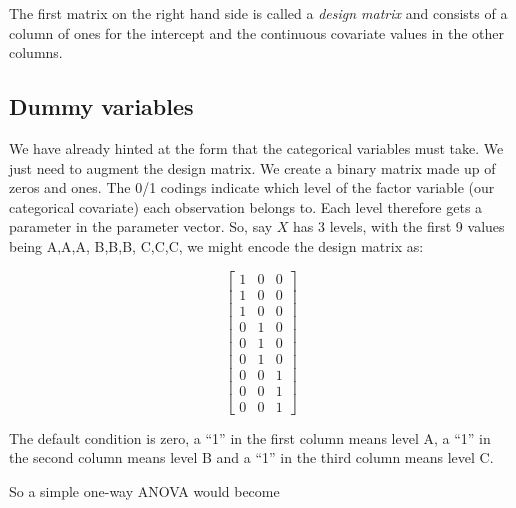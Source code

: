 \documentclass[
  oneside]{krantz}
\begin{document}
The first matrix on the right hand side is called a \emph{design matrix} and consists of a column of ones for the intercept and the continuous covariate values in the other columns.

\hypertarget{dummy-variables}{%
\subsection{Dummy variables}\label{dummy-variables}}

We have already hinted at the form that the categorical variables must take.
We just need to augment the design matrix.
We create a binary matrix made up of zeros and ones. The 0/1 codings indicate which level of the factor variable (our categorical covariate) each observation belongs to. Each level therefore gets a parameter in the parameter vector.
So, say \(X\) has 3 levels, with the first 9 values being A,A,A, B,B,B, C,C,C, we might encode the design matrix as:

\[
\left[\begin{array}
{ccc}
1 & 0 & 0\\
 1 & 0 &  0\\  
1 & 0 & 0\\ 
0 & 1 &  0\\
 0 & 1 &  0\\  
0 & 1 & 0\\
0 & 0 &  1\\
 0 & 0 &  1\\  
0 & 0 & 1
\end{array}\right]
\]

The default condition is zero, a ``1'' in the first column means level A, a ``1'' in the second column means level B and a ``1'' in the third column means level C.

So a simple one-way ANOVA would become
\end{document}
